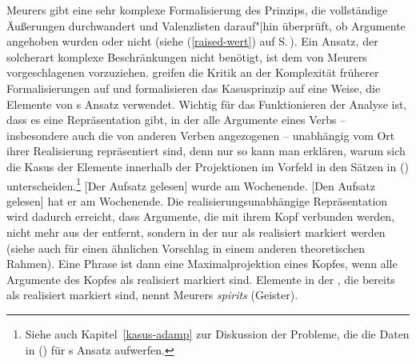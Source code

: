 {\noindent
Meurers gibt eine sehr komplexe Formalisierung des Prinzips, die vollständige Äußerungen
durchwandert und Valenzlisten darauf"|hin überprüft, ob Argumente angehoben wurden oder nicht (siehe
(\ref{raised-wert}) auf S.\,\pageref{raised-wert}). Ein Ansatz, der solcherart komplexe Beschränkungen 
nicht benötigt, ist dem von Meurers vorgeschlagenen vorzuziehen. 
%
\citet[--57]{MdK2001a} greifen die Kritik an der Komplexität früherer Formalisierungen
auf und formalisieren das Kasusprinzip auf eine Weise, die Elemente von \prz{}s Ansatz \citeyearpar{Prze99}
verwendet. Wichtig für das Funktionieren der Analyse ist, dass es eine Repräsentation
gibt, in der alle Argumente eines Verbs -- insbesondere auch die von anderen Verben angezogenen -- unabhängig
vom Ort ihrer Realisierung repräsentiert sind, denn nur so kann man erklären,
warum sich die Kasus der Elemente innerhalb der Projektionen im Vorfeld in
den Sätzen in () unterscheiden.\footnote{
  Siehe auch Kapitel~\ref{kasus-adamp} zur Diskussion der Probleme, die die Daten in () für \prz{}s Ansatz aufwerfen.%
}
\eal
\label{bsp-der-aufsatz-gelesen-zwei}
\ex {}[Der Aufsatz gelesen] wurde am Wochenende.
\ex {}[Den Aufsatz gelesen] hat er am Wochenende.
\zl
Die realisierungsunabhängige Repräsentation wird dadurch erreicht, dass
Argumente, die mit ihrem Kopf verbunden werden, nicht mehr aus der \compsl entfernt,
sondern in der \compsl nur als realisiert markiert werden (siehe auch  
für einen ähnlichen Vorschlag in einem anderen theoretischen Rahmen). 
Eine Phrase ist dann eine Maximalprojektion eines Kopfes, wenn alle Argumente des Kopfes als realisiert markiert sind.
Elemente in der \compsl, die bereits als realisiert markiert sind, nennt Meurers \emph{spirits}
(Geister).

}
